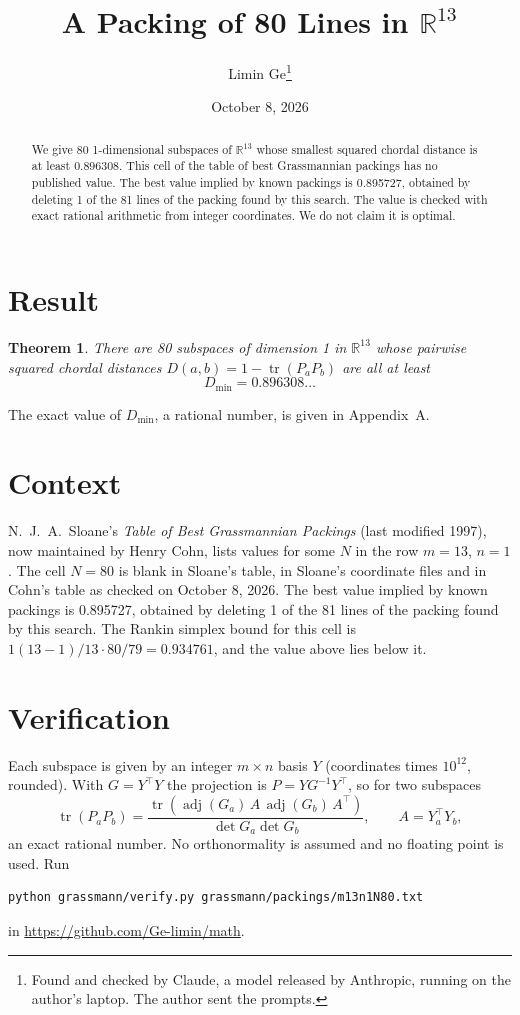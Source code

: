 \documentclass[11pt,a4paper]{article}
\title{A Packing of 80 Lines in $\mathbb{R}^{13}$}
\author{Limin Ge\thanks{Found and checked by Claude, a model released by Anthropic, running on the author's laptop. The author sent the prompts.}}
\date{October 8, 2026}
\newtheorem*{theorem}{Theorem}
\begin{document}
\maketitle
\begin{abstract}
We give 80 1-dimensional subspaces of $\mathbb{R}^{13}$ whose smallest squared chordal distance is at least 0.896308. This cell of the table of best Grassmannian packings has no published value. The best value implied by known packings is 0.895727, obtained by deleting 1 of the 81 lines of the packing found by this search. The value is checked with exact rational arithmetic from integer coordinates. We do not claim it is optimal.
\end{abstract}

\section{Result}
\begin{theorem}
There are 80 subspaces of dimension 1 in $\mathbb{R}^{13}$ whose pairwise squared chordal distances $D(a,b) = 1 - \operatorname{tr}(P_aP_b)$ are all at least
\[ D_{\min} = 0.896308\ldots \]
\end{theorem}
The exact value of $D_{\min}$, a rational number, is given in Appendix~A.


\section{Context}
N.~J.~A.~Sloane's \emph{Table of Best Grassmannian Packings} (last modified 1997), now maintained by Henry Cohn, lists values for some $N$ in the row $m=13$, $n=1$. The cell $N=80$ is blank in Sloane's table, in Sloane's coordinate files and in Cohn's table as checked on October 8, 2026. The best value implied by known packings is 0.895727, obtained by deleting 1 of the 81 lines of the packing found by this search. The Rankin simplex bound for this cell is $1(13-1)/13\cdot 80/79 = 0.934761$, and the value above lies below it.


\section{Verification}
Each subspace is given by an integer $m\times n$ basis $Y$ (coordinates times $10^{12}$, rounded). With $G=Y^\top Y$ the projection is $P=YG^{-1}Y^\top$, so for two subspaces
\[ \operatorname{tr}(P_aP_b)=\frac{\operatorname{tr}(\operatorname{adj}(G_a)\,A\,\operatorname{adj}(G_b)\,A^\top)}{\det G_a\det G_b},\qquad A=Y_a^\top Y_b, \]
an exact rational number. No orthonormality is assumed and no floating point is used. Run
\begin{verbatim}
python grassmann/verify.py grassmann/packings/m13n1N80.txt
\end{verbatim}
in \url{https://github.com/Ge-limin/math}.
\end{document}

